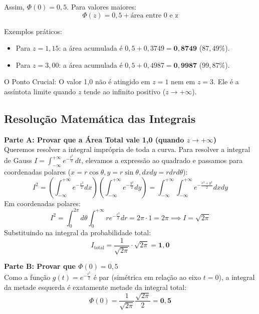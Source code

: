 \documentclass[12pt,a4paper]{article}
\begin{document}
Assim, $\Phi(0) = 0,5$. 
Para valores maiores:
\begin{equation}
\Phi(z) = 0,5 + \text{área entre 0 e z}
\end{equation}

Exemplos práticos:
\begin{itemize}
    \item Para $z = 1,15$: a área acumulada é $0,5 + 0,3749 = \mathbf{0,8749}$ ($87,49\%$).
    \item Para $z = 3,00$: a área acumulada é $0,5 + 0,4987 = \mathbf{0,9987}$ ($99,87\%$).
\end{itemize}

O Ponto Crucial: O valor 1,0 não é atingido em $z=1$ nem em $z=3$. Ele é a assíntota limite quando $z$ tende ao infinito positivo ($z \to +\infty$).

\subsection{Resolução Matemática das Integrais}
\textbf{Parte A: Provar que a Área Total vale 1,0 (quando $z \to +\infty$)}\\
Queremos resolver a integral imprópria de toda a curva. Para resolver a integral de Gauss $I = \int_{-\infty}^{+\infty} e^{-\frac{t^2}{2}} \, dt$, elevamos a expressão ao quadrado e passamos para coordenadas polares ($x = r\cos\theta, y = r\sin\theta, dx dy = r dr d\theta$):
\begin{equation}
I^2 = \left( \int_{-\infty}^{+\infty} e^{-\frac{x^2}{2}} dx \right) \left( \int_{-\infty}^{+\infty} e^{-\frac{y^2}{2}} dy \right) = \int_{-\infty}^{+\infty}\int_{-\infty}^{+\infty} e^{-\frac{x^2+y^2}{2}} dx dy
\end{equation}
Em coordenadas polares:
\begin{equation}
I^2 = \int_0^{2\pi} d\theta \int_0^{+\infty} r e^{-\frac{r^2}{2}} dr = 2\pi \cdot 1 = 2\pi \implies I = \sqrt{2\pi}
\end{equation}
Substituindo na integral da probabilidade total:
\begin{equation}
I_{\text{total}} = \frac{1}{\sqrt{2\pi}} \cdot \sqrt{2\pi} = \mathbf{1,0}
\end{equation}

\textbf{Parte B: Provar que $\Phi(0) = 0,5$}\\
Como a função $g(t) = e^{-\frac{t^2}{2}}$ é par (simétrica em relação ao eixo $t=0$), a integral da metade esquerda é exatamente metade da integral total:
\begin{equation}
\Phi(0) = \frac{1}{\sqrt{2\pi}} \frac{\sqrt{2\pi}}{2} = \mathbf{0,5}
\end{equation}
\end{document}
